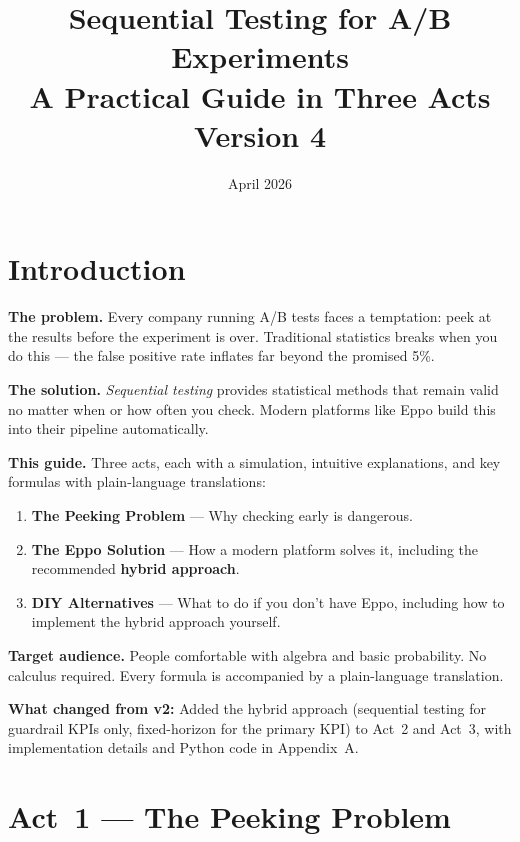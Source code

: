 \documentclass[12pt, a4paper]{article}
\title{\textbf{Sequential Testing for A/B Experiments}\\[6pt]
       \large A Practical Guide in Three Acts\\[4pt]
       \normalsize Version 4}
\author{}
\date{April 2026}
\begin{document}
\maketitle
\tableofcontents
\newpage

\section*{Introduction}

\textbf{The problem.}
Every company running A/B tests faces a temptation: peek at the results
before the experiment is over.  Traditional statistics breaks when you do
this --- the false positive rate inflates far beyond the promised 5\%.

\textbf{The solution.}
\emph{Sequential testing} provides statistical methods that remain valid
no matter when or how often you check.  Modern platforms like Eppo build
this into their pipeline automatically.

\textbf{This guide.}
Three acts, each with a simulation, intuitive explanations, and key formulas
with plain-language translations:
\begin{enumerate}[nosep]
  \item \textbf{The Peeking Problem} --- Why checking early is dangerous.
  \item \textbf{The Eppo Solution} --- How a modern platform solves it,
        including the recommended \textbf{hybrid approach}.
  \item \textbf{DIY Alternatives} --- What to do if you don't have Eppo,
        including how to implement the hybrid approach yourself.
\end{enumerate}

\textbf{Target audience.}
People comfortable with algebra and basic probability.  No calculus required.
Every formula is accompanied by a plain-language translation.

\textbf{What changed from v2:}
Added the hybrid approach (sequential testing for guardrail KPIs only,
fixed-horizon for the primary KPI) to Act~2 and Act~3, with implementation
details and Python code in Appendix~A.


\newpage
\section{Act~1 --- The Peeking Problem}
\end{document}
